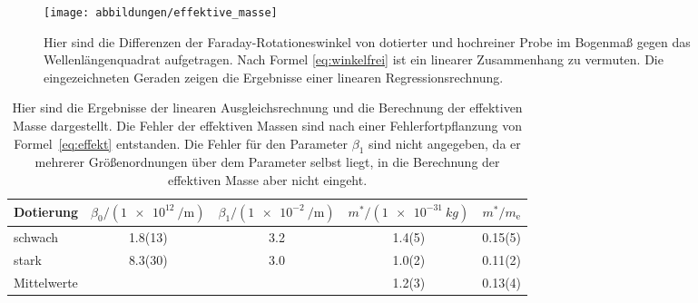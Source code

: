 \begin{figure}
  \centering
  \texttt{[image: abbildungen/effektive\_masse]}
  \caption{Hier sind die Differenzen der Faraday-Rotationeswinkel von 
    dotierter und hochreiner Probe im Bogenmaß gegen das
    Wellenlängenquadrat aufgetragen.  Nach Formel \eqref{eq:winkelfrei}
    ist ein linearer Zusammenhang zu vermuten.  Die eingezeichneten
    Geraden zeigen die Ergebnisse einer linearen Regressionsrechnung.}
  \label{fig:linregress}
\end{figure}

\begin{table}
  \centering
  \begin{tabular}{lSSSS[table-figures-decimal=2]}
    \toprule
    {Dotierung} &
    {$\beta_0/(\SI{1e12}{\per\meter})$}&
    {$\beta_1/(\SI{1e-2}{\per\meter})$} &
    {$m^*/(\SI{1e-31}{kg})$} &
    {$m^*/m_\text{e}$}
    \\
    \midrule
    schwach& 1.8(13) & 3.2 & 1.4(5) & 0.15(5)\\
    stark  & 8.3(30) & 3.0 & 1.0(2) & 0.11(2)\\
    \midrule
    Mittelwerte & & & 1.2(3) & 0.13(4)\\
    \bottomrule
  \end{tabular}
  \caption{Hier sind die Ergebnisse der linearen Ausgleichsrechnung und
    die Berechnung der effektiven Masse dargestellt. Die Fehler der 
    effektiven Massen sind nach einer 
    Fehlerfortpflanzung von Formel~\eqref{eq:effekt} entstanden.
    Die Fehler für den Parameter
    $\beta_1$ sind nicht angegeben, da er mehrerer Größenordnungen über
    dem Parameter selbst liegt, in die Berechnung der effektiven 
    Masse aber nicht eingeht.}
  \label{tab:linregress}
\end{table}
